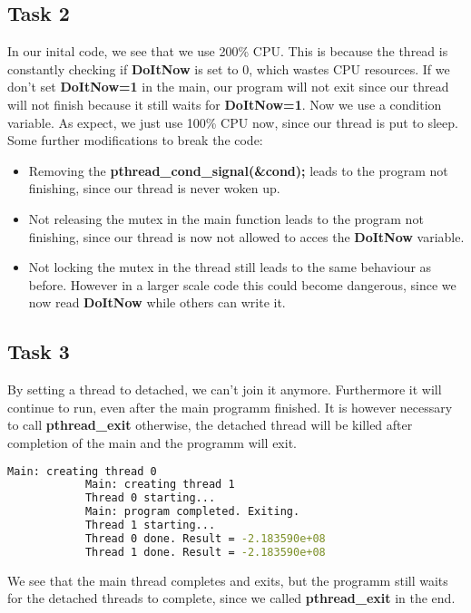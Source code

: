 \documentclass[a4paper]{scrartcl}
\begin{document}
    \subsection{Task 2}
        In our inital code, we see that we use 200\% CPU. This is because the
        thread is constantly checking if \textbf{DoItNow} is set to 0, which
        wastes CPU resources. If we don't set \textbf{DoItNow=1} in the main,
        our program will not exit since our thread will not finish because it
        still waits for \textbf{DoItNow=1}. Now we use a condition variable. As
        expect, we just use 100\% CPU now, since our thread is put to sleep.
        Some further modifications to break the code:
        \begin{itemize}
            \item Removing the \textbf{pthread\_cond\_signal(\&cond);} leads to
            the program not finishing, since our thread is never woken up.
            \item Not releasing the mutex in the main function leads to the
            program not finishing, since our thread is now not allowed to acces
            the \textbf{DoItNow} variable.
            \item Not locking the mutex in the thread still leads to the same
            behaviour as before. However in a larger scale code this could
            become dangerous, since we now read \textbf{DoItNow} while others
            can write it.
        \end{itemize}

    \subsection{Task 3}
        By setting a thread to detached, we can't join it anymore. Furthermore
        it will continue to run, even after the main programm finished.  It is
        however necessary to call \textbf{pthread\_exit} otherwise, the detached
        thread will be killed after completion of the main and the programm
        will exit.
        \begin{lstlisting}[language=bash]
            Main: creating thread 0
            Main: creating thread 1
            Thread 0 starting...
            Main: program completed. Exiting.
            Thread 1 starting...
            Thread 0 done. Result = -2.183590e+08
            Thread 1 done. Result = -2.183590e+08
        \end{lstlisting}
        We see that the main thread completes and exits, but the programm still
        waits for the detached threads to complete, since we called
        \textbf{pthread\_exit} in the end.
\end{document}
